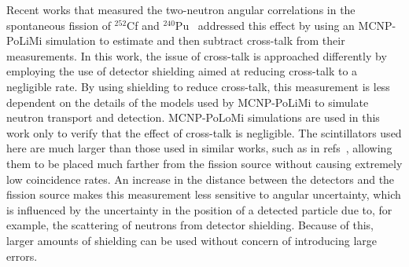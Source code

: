 Recent works that measured the two-neutron angular correlations in the spontaneous fission of $^{252}$Cf and $^{240}$Pu~\cite{Pozzi2016,Verbeke2018} addressed this effect by using an MCNP-PoLiMi simulation to estimate and then subtract cross-talk from their measurements.
In this work, the issue of cross-talk is approached differently by employing the use of detector shielding aimed at reducing cross-talk to a negligible rate.
By using shielding to reduce cross-talk, this measurement is less dependent on the details of the models used by MCNP-PoLiMi to simulate neutron transport and detection.
MCNP-PoLoMi simulations are used in this work only to verify that the effect of cross-talk is negligible.
The scintillators used here are much larger than those used in similar works, such as in refs~\cite{Pozzi2016,Verbeke2018}, allowing them to be placed much farther from the fission source without causing extremely low coincidence rates. 
An increase in the distance between the detectors and the fission source makes this measurement less sensitive to angular uncertainty, which is influenced by the uncertainty in the position of a detected particle due to, for example, the scattering of neutrons from detector shielding.
Because of this, larger amounts of shielding can be used without concern of introducing large errors.

